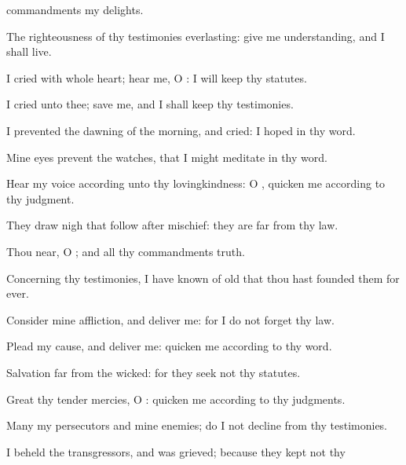 {commandments
{} my
delights.
\par }{\Q {}The
righteousness of thy
testimonies
{}
everlasting: give me
understanding, and I shall
live.
\par }{\BB \par }{
\par }{\Q {}I
cried with
{} whole
heart;
hear me, O
{}: I will
keep thy
statutes.
\par }{\Q {}I
cried unto thee;
save me, and I shall
keep thy
testimonies.
\par }{\BB \par }{\Q {}I
prevented the dawning of the
morning, and
cried: I
hoped in thy
word.
\par }{\Q {}Mine
eyes
prevent the
{}
watches, that I might
meditate in thy
word.
\par }{\Q {}Hear my
voice according unto thy
lovingkindness: O
{},
quicken me according to thy
judgment.
\par }{\BB \par }{\Q {}They draw
nigh that
follow after
mischief: they are
far from thy
law.
\par }{\Q {}Thou
{}
near, O
{}; and all thy
commandments
{}
truth.
\par }{\Q {}Concerning thy
testimonies, I have
known of
old that thou hast
founded them for
ever.
\par }{\BB \par }{
\par }{\Q {}Consider mine
affliction, and
deliver me: for I do not
forget thy
law.
\par }{\Q {}Plead my
cause, and
deliver me:
quicken me according to thy
word.
\par }{\Q {}Salvation
{}
far from the
wicked: for they
seek not thy
statutes.
\par }{\Q {}Great
{} thy tender
mercies, O
{}:
quicken me according to thy
judgments.
\par }{\Q {}Many
{} my
persecutors and mine
enemies;
{} do I not
decline from thy
testimonies.
\par }{\Q {}I
beheld the
transgressors, and was
grieved; because they
kept not thy
}
